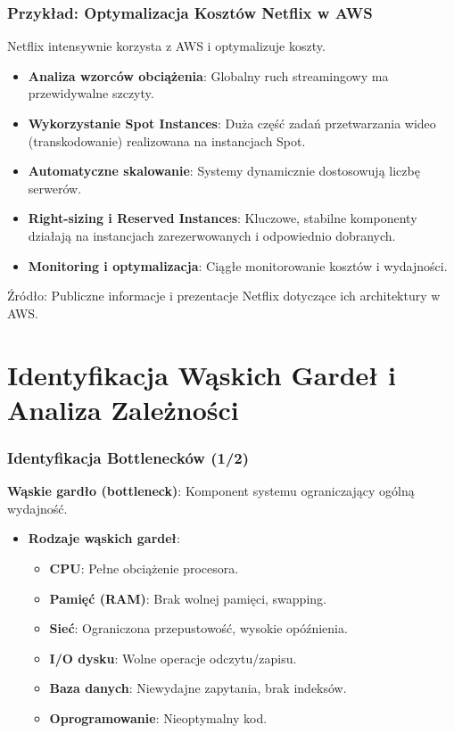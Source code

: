 \documentclass[aspectratio=169,xcolor=table]{beamer}
\begin{document}
\begin{frame}
  \frametitle{Przykład: Optymalizacja Kosztów Netflix w AWS}
  Netflix intensywnie korzysta z AWS i optymalizuje koszty.
  \begin{itemize}
    \item \textbf{Analiza wzorców obciążenia}: Globalny ruch streamingowy ma przewidywalne szczyty.
    \item \textbf{Wykorzystanie Spot Instances}: Duża część zadań przetwarzania wideo (transkodowanie) realizowana na instancjach Spot.
    \item \textbf{Automatyczne skalowanie}: Systemy dynamicznie dostosowują liczbę serwerów.
    \item \textbf{Right-sizing i Reserved Instances}: Kluczowe, stabilne komponenty działają na instancjach zarezerwowanych i odpowiednio dobranych.
    \item \textbf{Monitoring i optymalizacja}: Ciągłe monitorowanie kosztów i wydajności.
  \end{itemize}
  \footnotesize Źródło: Publiczne informacje i prezentacje Netflix dotyczące ich architektury w AWS.
\end{frame}

\section{Identyfikacja Wąskich Gardeł i Analiza Zależności}

\begin{frame}
  \frametitle{Identyfikacja Bottlenecków (1/2)}
  \textbf{Wąskie gardło (bottleneck)}: Komponent systemu ograniczający ogólną wydajność.
  \begin{itemize}
    \item \textbf{Rodzaje wąskich gardeł}:
        \begin{itemize}
            \item \textbf{CPU}: Pełne obciążenie procesora.
            \item \textbf{Pamięć (RAM)}: Brak wolnej pamięci, swapping.
            \item \textbf{Sieć}: Ograniczona przepustowość, wysokie opóźnienia.
            \item \textbf{I/O dysku}: Wolne operacje odczytu/zapisu.
            \item \textbf{Baza danych}: Niewydajne zapytania, brak indeksów.
            \item \textbf{Oprogramowanie}: Nieoptymalny kod.
        \end{itemize}
  \end{itemize}
\end{frame}
\end{document}
